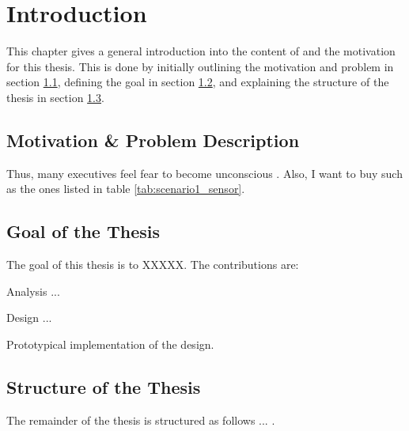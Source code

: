 
\cleardoublepage
\chapter{Introduction}
\label{cha:introduction}

This chapter gives a general introduction into the content of and the motivation for this thesis. This is done by initially outlining the motivation and problem in section \ref{sec:motivation}, defining the goal in section \ref{sec:goal}, and explaining the structure of the thesis in section \ref{sec:structure}.

\section{Motivation \& Problem Description}
\label{sec:motivation}

Thus, many executives feel fear to become unconscious \cite{TheInquisitiveMind}.
Also, I want to buy  such as the ones listed in table \ref{tab:scenario1_sensor}.


\section{Goal of the Thesis}
\label{sec:goal}

The goal of this thesis is to XXXXX. The contributions are:

\begin{cEnum}
    \item Analysis ...
    \item Design ...
    \item Prototypical implementation of the design.
\end{cEnum}

\section{Structure of the Thesis}
\label{sec:structure}

The remainder of the thesis is structured as follows ... .

